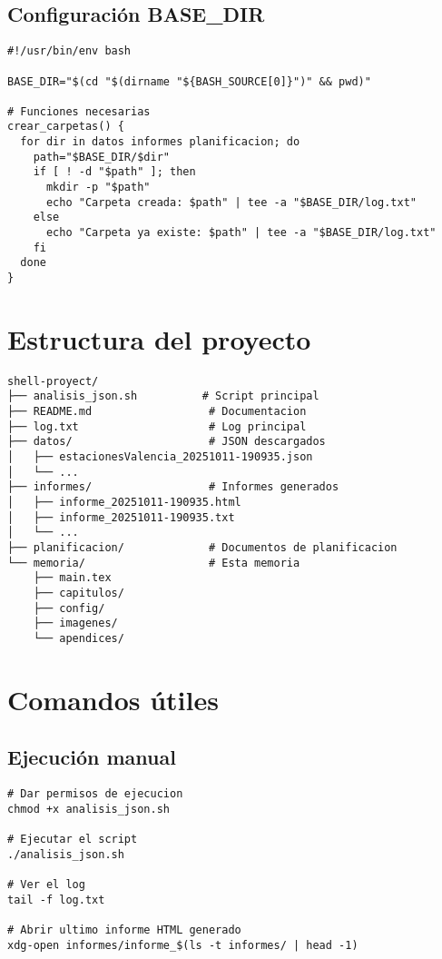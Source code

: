 \subsection{Configuración BASE\_DIR}

\begin{lstlisting}[style=bash,caption={Rutas absolutas con BASE\_DIR}]
#!/usr/bin/env bash

BASE_DIR="$(cd "$(dirname "${BASH_SOURCE[0]}")" && pwd)"

# Funciones necesarias
crear_carpetas() {
  for dir in datos informes planificacion; do
    path="$BASE_DIR/$dir"
    if [ ! -d "$path" ]; then
      mkdir -p "$path"
      echo "Carpeta creada: $path" | tee -a "$BASE_DIR/log.txt"
    else
      echo "Carpeta ya existe: $path" | tee -a "$BASE_DIR/log.txt"
    fi
  done
}
\end{lstlisting}

\section{Estructura del proyecto}

\begin{lstlisting}[style=bash]
shell-proyect/
├── analisis_json.sh          # Script principal
├── README.md                  # Documentacion
├── log.txt                    # Log principal
├── datos/                     # JSON descargados
│   ├── estacionesValencia_20251011-190935.json
│   └── ...
├── informes/                  # Informes generados
│   ├── informe_20251011-190935.html
│   ├── informe_20251011-190935.txt
│   └── ...
├── planificacion/             # Documentos de planificacion
└── memoria/                   # Esta memoria
    ├── main.tex
    ├── capitulos/
    ├── config/
    ├── imagenes/
    └── apendices/
\end{lstlisting}

\section{Comandos útiles}

\subsection{Ejecución manual}

\begin{lstlisting}[style=bash]
# Dar permisos de ejecucion
chmod +x analisis_json.sh

# Ejecutar el script
./analisis_json.sh

# Ver el log
tail -f log.txt

# Abrir ultimo informe HTML generado
xdg-open informes/informe_$(ls -t informes/ | head -1)
\end{lstlisting}

